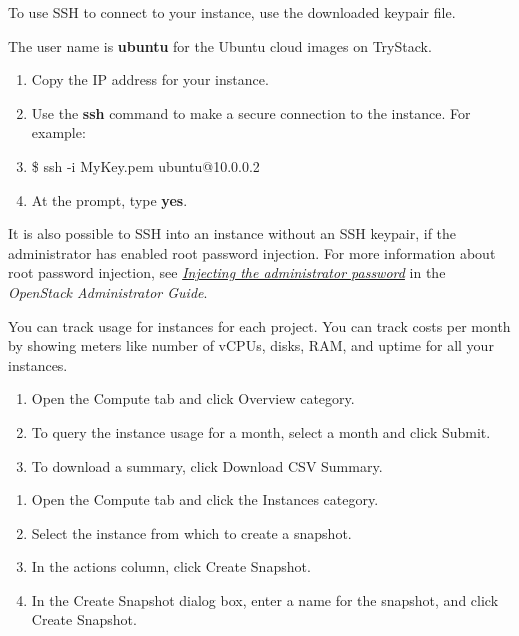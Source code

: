 To use SSH to connect to your instance, use the downloaded keypair file.

 The user name is \textbf{ubuntu} for the Ubuntu cloud
images on TryStack.

\begin{enumerate}
\def\labelenumi{\arabic{enumi}.}
\item Copy the IP address for your instance.
\item Use the \textbf{ssh} command to make a secure connection to the
  instance. For example:
\item \$ ssh -i MyKey.pem ubuntu@10.0.0.2
\item At the prompt, type \textbf{yes}.
\end{enumerate}

It is also possible to SSH into an instance without an SSH keypair, if
the administrator has enabled root password injection. For more
information about root password injection, see
\href{https://docs.openstack.org/nova/\osversion/admin/admin-password-injection.html}{\emph{Injecting the administrator password}} in the \emph{OpenStack Administrator
Guide}.

\label{track-usage-for-instances}

You can track usage for instances for each project. You can track costs
per month by showing meters like number of vCPUs, disks, RAM, and uptime
for all your instances.

\begin{enumerate}
\def\labelenumi{\arabic{enumi}.}
\item Open the Compute tab and click Overview category.
\item To query the instance usage for a month, select a month and click
  Submit.
\item To download a summary, click Download CSV Summary.
\end{enumerate}

\label{create-an-instance-snapshot}

\begin{enumerate}
\def\labelenumi{\arabic{enumi}.}
\item Open the Compute tab and click the Instances
  category.
\item Select the instance from which to create a snapshot.
\item In the actions column, click Create Snapshot.
\item In the Create Snapshot dialog box, enter a name for the snapshot, and
  click Create Snapshot.
\end{enumerate}

